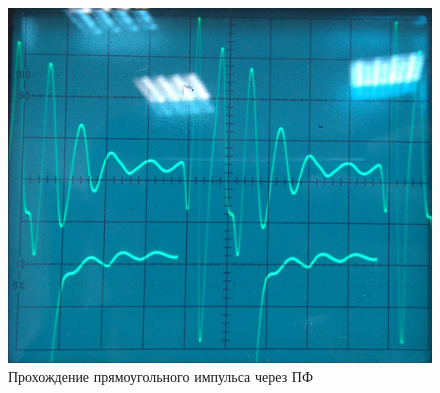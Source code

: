 \begin{figure}[H]
	\centering
	\includegraphics[scale=0.25]{images/2}
	\caption{Прохождение прямоугольного импульса через ПФ}
	\label{fig:ris2}
\end{figure}


